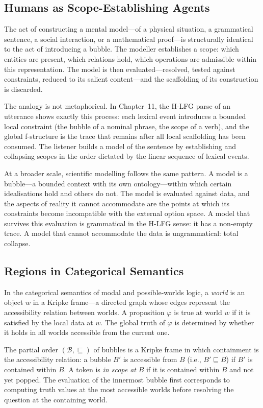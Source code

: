 \documentclass[12pt, oneside]{amsbook}
\theoremstyle{plain}
\theoremstyle{definition}
\theoremstyle{remark}
\begin{document}
\subsection{Humans as Scope-Establishing Agents}

The act of constructing a mental model---of a physical situation, a
grammatical sentence, a social interaction, or a mathematical proof---is
structurally identical to the act of introducing a bubble. The modeller
establishes a scope: which entities are present, which relations hold, which
operations are admissible within this representation. The model is then
evaluated---resolved, tested against constraints, reduced to its salient
content---and the scaffolding of its construction is discarded.

The analogy is not metaphorical. In Chapter~11, the H-LFG parse of an
utterance shows exactly this process: each lexical event introduces a
bounded local constraint (the bubble of a nominal phrase, the scope of a
verb), and the global f-structure is the trace that remains after all local
scaffolding has been consumed. The listener builds a model of the sentence by
establishing and collapsing scopes in the order dictated by the linear sequence
of lexical events.

At a broader scale, scientific modelling follows the same pattern. A model is
a bubble---a bounded context with its own ontology---within which certain
idealisations hold and others do not. The model is evaluated against data,
and the aspects of reality it cannot accommodate are the points at which its
constraints become incompatible with the external option space. A model that
survives this evaluation is grammatical in the H-LFG sense: it has a non-empty
trace. A model that cannot accommodate the data is ungrammatical: total
collapse.

\subsection{Regions in Categorical Semantics}

In the categorical semantics of modal and possible-worlds logic, a \emph{world}
is an object $w$ in a Kripke frame---a directed graph whose edges represent
the accessibility relation between worlds. A proposition $\varphi$ is true at
world $w$ if it is satisfied by the local data at $w$. The global truth of
$\varphi$ is determined by whether it holds in all worlds accessible from
the current one.

The partial order $(\mathcal{B}, \sqsubseteq)$ of bubbles is a Kripke frame
in which containment is the accessibility relation: a bubble $B'$ is
accessible from $B$ (i.e., $B' \sqsubseteq B$) if $B'$ is contained within
$B$. A token is \emph{in scope at} $B$ if it is contained within $B$ and not
yet popped. The evaluation of the innermost bubble first corresponds to
computing truth values at the most accessible worlds before resolving the
question at the containing world.
\end{document}
